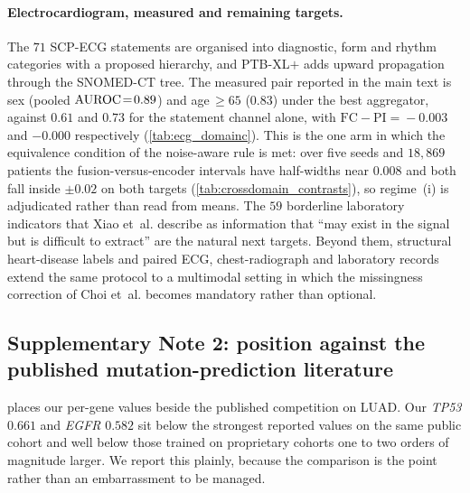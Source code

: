 \paragraph{Electrocardiogram, measured and remaining targets.}
The $71$ SCP-ECG statements are organised into diagnostic, form and
rhythm categories with a proposed hierarchy,\cite{wagner2020ptbxl} and
PTB-XL$+$ adds upward propagation through the SNOMED-CT
tree.\cite{strodthoff2023ptbxlplus} The measured pair reported in the
main text is sex (pooled $\text{AUROC}\!=\!0.89$) and age$\,\geq\!65$ ($0.83$)
under the best aggregator, against $0.61$ and $0.73$ for the statement
channel alone, with $\mathrm{FC}-\mathrm{PI}\!=\!-0.003$ and $-0.000$
respectively (\cref{tab:ecg_domainc}). This is the one arm in which the
equivalence condition of the noise-aware rule is met: over five seeds
and $18{,}869$
patients the fusion-versus-encoder intervals have half-widths near
$0.008$ and both fall inside $\pm0.02$ on both targets
(\cref{tab:crossdomain_contrasts}), so regime~(i) is adjudicated rather
than read from means. The $59$ borderline laboratory
indicators that Xiao et~al.\cite{xiao2025anyecglab} describe as information that
``may exist in the signal but is difficult to extract'' are the natural
next targets. Beyond them, structural heart-disease labels and paired
ECG, chest-radiograph and laboratory records extend the same protocol to
a multimodal setting in which the missingness correction of
Choi et~al.\cite{choi2025icym2i} becomes mandatory rather than optional.

\subsection*{Supplementary Note 2: position against the published
mutation-prediction literature}

 places our per-gene values beside the published
competition on LUAD. Our \textit{TP53} $0.661$ and \textit{EGFR} $0.582$
sit below the strongest reported values on the same public cohort and
well below those trained on proprietary cohorts one to two orders of
magnitude larger. We report this plainly, because the comparison is the
point rather than an embarrassment to be managed.

